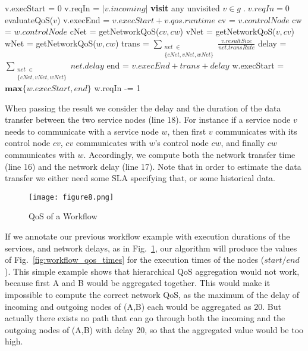 \documentclass[10pt, conference, compsocconf]{IEEEtran}
\newcommand{\oneHalfImages}{2.12in}
\begin{document}
\begin{algorithm}
	\label{algo:simulateExecution}
	\begin{algorithmic}[1]
				\State v.execStart = 0
				\State v.reqIn = $\left|v.incoming\right|$
			\EndFor
				\State \textbf{visit} any unvisited $v \in g \; . \; v.reqIn = 0$
				\State evaluateQoS($v$)
				\State v.execEnd = $v.execStart + v.qos.runtime$
					\State cv = $v.controlNode$
					\State cw = $w.controlNode$
					\State cNet = getNetworkQoS($cv, cw$)
					\State vNet = getNetworkQoS($v, cv$)
					\State wNet = getNetworkQoS($w, cw$)
					\State trans = $\displaystyle\sum_{\substack{net \; \in \\\{cNet, vNet, wNet\}}}{\frac{v.resultSize}{net.transRate}}$
					\State delay = $\displaystyle\sum_{\substack{net \; \in \\\{cNet, vNet, wNet\}}}{net.delay}$
					\State end = $v.execEnd + trans + delay$
					\State w.execStart = $\textbf{max}\{w.execStart, end\}$
					\State w.reqIn -= 1
				\EndFor
			\EndWhile
		\EndProcedure
	\end{algorithmic}
\end{algorithm}

\noindent When passing the result we consider the delay and the duration of the data transfer between the two service nodes (line 18).
For instance if a service node $v$ needs to communicate with a service node $w$,
	then first $v$ communicates with its control node $cv$,
		$cv$ communicates with $w$'s control node $cw$,
			and finally $cw$ communicates with $w$.
Accordingly, we compute both the network transfer time (line 16) and the network delay (line 17).
Note that in order to estimate the data transfer we either need some SLA specifying that, or some historical data.

\begin{figure}[htb!]
	\centering
	\texttt{[image: figure8.png]}
	\caption{QoS of a Workflow}
	\label{fig:workflow_qos}
\end{figure}

If we annotate our previous workflow example with execution durations of the services,
	and network delays, as in Fig.~\ref{fig:workflow_qos},
		our algorithm will produce the values of Fig.~\ref{fig:workflow_qos_times} for the execution times of the nodes ($start/end$).
This simple example shows that hierarchical QoS aggregation would not work,
	because first A and B would be aggregated together.
This would make it impossible to compute the correct network QoS,
	as the maximum of the delay of incoming and outgoing nodes of (A,B) each would be aggregated as 20.
But actually there exists no path that can go through both the incoming and the outgoing nodes of (A,B) with delay 20,
	so that the aggregated value would be too high.
	
\end{document}
